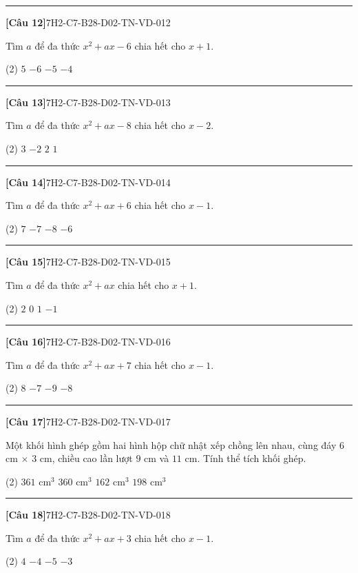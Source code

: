 \documentclass[12pt,a4paper]{article}
\newif\ifloigiai
\newenvironment{cauhoi}[2]{%
  \par\medskip\noindent\rule{\textwidth}{0.4pt}\par\nopagebreak
  \noindent\textbf{[#1]}\hfill{\scriptsize\ttfamily #2}\par\nopagebreak\smallskip}{\par}
\newcommand{\dapan}[1]{\ifloigiai\par\smallskip\noindent\textit{Đáp án:} \textbf{#1}\par\fi}
\begin{document}
\begin{cauhoi}{Câu 12}{7H2-C7-B28-D02-TN-VD-012}
Tìm $a$ để đa thức $x^{2}+ax-6$ chia hết cho $x+1$.
\begin{tasks}(2)
\task $5$
\task $-6$
\task $-5$
\task $-4$
\end{tasks}
\dapan{C}
\end{cauhoi}
\begin{cauhoi}{Câu 13}{7H2-C7-B28-D02-TN-VD-013}
Tìm $a$ để đa thức $x^{2}+ax-8$ chia hết cho $x-2$.
\begin{tasks}(2)
\task $3$
\task $-2$
\task $2$
\task $1$
\end{tasks}
\dapan{C}
\end{cauhoi}
\begin{cauhoi}{Câu 14}{7H2-C7-B28-D02-TN-VD-014}
Tìm $a$ để đa thức $x^{2}+ax+6$ chia hết cho $x-1$.
\begin{tasks}(2)
\task $7$
\task $-7$
\task $-8$
\task $-6$
\end{tasks}
\dapan{B}
\end{cauhoi}
\begin{cauhoi}{Câu 15}{7H2-C7-B28-D02-TN-VD-015}
Tìm $a$ để đa thức $x^{2}+ax$ chia hết cho $x+1$.
\begin{tasks}(2)
\task $2$
\task $0$
\task $1$
\task $-1$
\end{tasks}
\dapan{C}
\end{cauhoi}
\begin{cauhoi}{Câu 16}{7H2-C7-B28-D02-TN-VD-016}
Tìm $a$ để đa thức $x^{2}+ax+7$ chia hết cho $x-1$.
\begin{tasks}(2)
\task $8$
\task $-7$
\task $-9$
\task $-8$
\end{tasks}
\dapan{D}
\end{cauhoi}
\begin{cauhoi}{Câu 17}{7H2-C7-B28-D02-TN-VD-017}
Một khối hình ghép gồm hai hình hộp chữ nhật xếp chồng lên nhau, cùng đáy $6$ cm $\times$ $3$ cm, chiều cao lần lượt $9$ cm và $11$ cm. Tính thể tích khối ghép.
\begin{tasks}(2)
\task $361\text{ cm}^3$
\task $360\text{ cm}^3$
\task $162\text{ cm}^3$
\task $198\text{ cm}^3$
\end{tasks}
\dapan{B}
\end{cauhoi}
\begin{cauhoi}{Câu 18}{7H2-C7-B28-D02-TN-VD-018}
Tìm $a$ để đa thức $x^{2}+ax+3$ chia hết cho $x-1$.
\begin{tasks}(2)
\task $4$
\task $-4$
\task $-5$
\task $-3$
\end{tasks}
\dapan{B}
\end{cauhoi}
\end{document}
